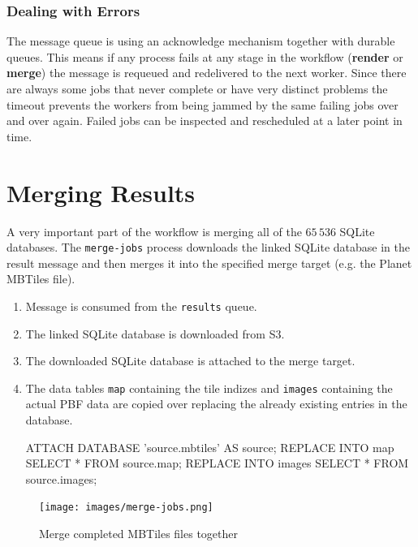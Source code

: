 \subsubsection{Dealing with Errors}

The message queue is using an acknowledge mechanism together with durable queues.
This means if any process fails at any stage in the workflow (\textbf{render} or \textbf{merge}) the message is requeued and redelivered to the next worker.
Since there are always some jobs that never complete or have very distinct problems the timeout prevents the workers from being jammed by the same failing jobs over and over again.
Failed jobs can be inspected and rescheduled at a later point in time.

\newpage{}
\section{Merging Results}

A very important part of the workflow is merging all of the $65\,536$ SQLite databases.
The \texttt{merge-jobs} process downloads the linked SQLite database in the result message
and then merges it into the specified merge target (e.g. the Planet MBTiles file).

\begin{enumerate}  
    \item Message is consumed from the \texttt{results} queue.
    \item The linked SQLite database is downloaded from S3.
    \item The downloaded SQLite database is attached to the merge target.
    \item  The data tables \texttt{map} containing the tile indizes and \texttt{images} containing the actual PBF data are copied over replacing the already existing entries in the database.
    
\begin{sqlcode}
ATTACH DATABASE 'source.mbtiles' AS source;
REPLACE INTO map SELECT * FROM source.map;
REPLACE INTO images SELECT * FROM source.images;
\end{sqlcode}
    
\end{enumerate}

\begin{figure}[H]
  \centering
  \texttt{[image: images/merge-jobs.png]}
  \caption{Merge completed MBTiles files together}
\end{figure}

